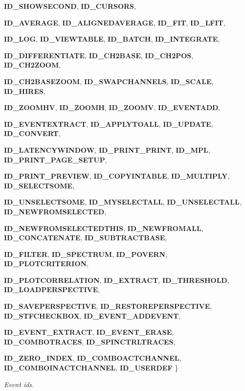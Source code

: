 \begin{DoxyCompactItemize}
{\bfseries ID\_\-SHOWSECOND}, 
{\bfseries ID\_\-CURSORS}, 
\par
{\bfseries ID\_\-AVERAGE}, 
{\bfseries ID\_\-ALIGNEDAVERAGE}, 
{\bfseries ID\_\-FIT}, 
{\bfseries ID\_\-LFIT}, 
\par
{\bfseries ID\_\-LOG}, 
{\bfseries ID\_\-VIEWTABLE}, 
{\bfseries ID\_\-BATCH}, 
{\bfseries ID\_\-INTEGRATE}, 
\par
{\bfseries ID\_\-DIFFERENTIATE}, 
{\bfseries ID\_\-CH2BASE}, 
{\bfseries ID\_\-CH2POS}, 
{\bfseries ID\_\-CH2ZOOM}, 
\par
{\bfseries ID\_\-CH2BASEZOOM}, 
{\bfseries ID\_\-SWAPCHANNELS}, 
{\bfseries ID\_\-SCALE}, 
{\bfseries ID\_\-HIRES}, 
\par
{\bfseries ID\_\-ZOOMHV}, 
{\bfseries ID\_\-ZOOMH}, 
{\bfseries ID\_\-ZOOMV}, 
{\bfseries ID\_\-EVENTADD}, 
\par
{\bfseries ID\_\-EVENTEXTRACT}, 
{\bfseries ID\_\-APPLYTOALL}, 
{\bfseries ID\_\-UPDATE}, 
{\bfseries ID\_\-CONVERT}, 
\par
{\bfseries ID\_\-LATENCYWINDOW}, 
{\bfseries ID\_\-PRINT\_\-PRINT}, 
{\bfseries ID\_\-MPL}, 
{\bfseries ID\_\-PRINT\_\-PAGE\_\-SETUP}, 
\par
{\bfseries ID\_\-PRINT\_\-PREVIEW}, 
{\bfseries ID\_\-COPYINTABLE}, 
{\bfseries ID\_\-MULTIPLY}, 
{\bfseries ID\_\-SELECTSOME}, 
\par
{\bfseries ID\_\-UNSELECTSOME}, 
{\bfseries ID\_\-MYSELECTALL}, 
{\bfseries ID\_\-UNSELECTALL}, 
{\bfseries ID\_\-NEWFROMSELECTED}, 
\par
{\bfseries ID\_\-NEWFROMSELECTEDTHIS}, 
{\bfseries ID\_\-NEWFROMALL}, 
{\bfseries ID\_\-CONCATENATE}, 
{\bfseries ID\_\-SUBTRACTBASE}, 
\par
{\bfseries ID\_\-FILTER}, 
{\bfseries ID\_\-SPECTRUM}, 
{\bfseries ID\_\-POVERN}, 
{\bfseries ID\_\-PLOTCRITERION}, 
\par
{\bfseries ID\_\-PLOTCORRELATION}, 
{\bfseries ID\_\-EXTRACT}, 
{\bfseries ID\_\-THRESHOLD}, 
{\bfseries ID\_\-LOADPERSPECTIVE}, 
\par
{\bfseries ID\_\-SAVEPERSPECTIVE}, 
{\bfseries ID\_\-RESTOREPERSPECTIVE}, 
{\bfseries ID\_\-STFCHECKBOX}, 
{\bfseries ID\_\-EVENT\_\-ADDEVENT}, 
\par
{\bfseries ID\_\-EVENT\_\-EXTRACT}, 
{\bfseries ID\_\-EVENT\_\-ERASE}, 
{\bfseries ID\_\-COMBOTRACES}, 
{\bfseries ID\_\-SPINCTRLTRACES}, 
\par
{\bfseries ID\_\-ZERO\_\-INDEX}, 
{\bfseries ID\_\-COMBOACTCHANNEL}, 
{\bfseries ID\_\-COMBOINACTCHANNEL}, 
{\bfseries ID\_\-USERDEF}
 \}
\begin{DoxyCompactList}\small\item\em Event ids. \item\end{DoxyCompactList}\end{DoxyCompactItemize}
